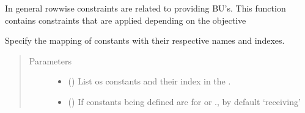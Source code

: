 \documentclass[letterpaper,10pt,english]{sphinxmanual}
\begin{document}
\begin{fulllineitems}
\begin{fulllineitems}
In general row\sphinxhyphen{}wise constraints are related to providing BU’s.
This function contains constraints that are applied depending on the objective

\end{fulllineitems}


\begin{fulllineitems}
\label{\detokenize{source/optimization.model:optimization.model.optimizer.OptimizationModel._specify_constants}}
Specify the mapping of constants with their respective names and indexes.
\begin{quote}\begin{description}
\item[{Parameters}] \leavevmode\begin{itemize}
\item {} 
 () \textendash{} List os constants and their index in the .

\item {} 
 (\sphinxstyleliteralemphasis{\sphinxupquote{, }}) \textendash{} If constants being defined are for  or ., by default ‘receiving’

\end{itemize}

\end{description}\end{quote}

\end{fulllineitems}



\end{fulllineitems}
\end{document}
